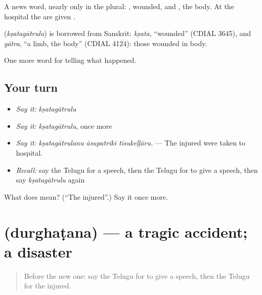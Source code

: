 A news word, nearly only in the plural: , wounded, and , the body. At the hospital the  are given .

\begin{cousinweb}
\textbf{} (\emph{kṣatagātrulu}) is borrowed from Sanskrit: \emph{kṣata}, \textquotedblleft{}wounded\textquotedblright{} (CDIAL 3645), and \emph{gātra}, \textquotedblleft{}a limb, the body\textquotedblright{} (CDIAL 4124): those wounded in body.
\end{cousinweb}

\begin{grammarlens}[title={What you've built}]
One more word for telling what happened.
\end{grammarlens}

\subsection*{Your turn}
\begin{itemize}
\raggedright
  \item \emph{Say it:} \emph{kṣatagātrulu}
  \item \emph{Say it:} \emph{kṣatagātrulu}, once more
  \item \emph{Say it:} \emph{kṣatagātrulanu āsupatriki tīsukeḷḷāru.} — The injured were taken to hospital.
  \item \emph{Recall:} say the Telugu for a speech, then the Telugu for to give a speech, then say \emph{kṣatagātrulu} again
\end{itemize}

\begin{tcolorbox}[breakable,colback=teal!4,colframe=teal!35!black,title={Before you move on}]
What does  mean? (\textquotedblleft{}The injured\textquotedblright{}.) Say it once more.
\end{tcolorbox}
\section[\texorpdfstring{\te{దుర్ఘటన} (durghaṭana)}{దుర్ఘటన (durghaṭana)}]{ (durghaṭana) — a tragic accident; a disaster}

\label{lesson:TE-C343-durghatana}



\begin{quote}
Before the new one: say the Telugu for to give a speech, then the Telugu for the injured.
\end{quote}


